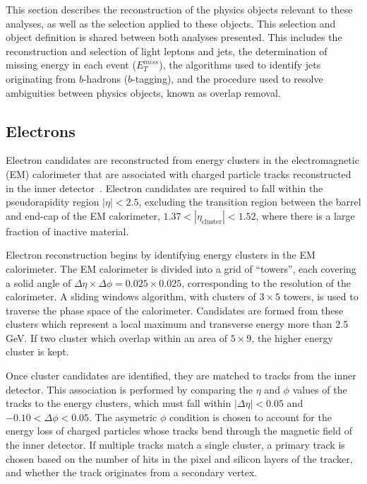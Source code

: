 
This section describes the reconstruction of the physics objects relevant to these analyses, as well as the selection applied to these objects. This selection and object definition is shared between both analyses presented. This includes the reconstruction and selection of light leptons and jets, the determination of missing energy in each event ($E_T^{miss}$), the algorithms used to identify jets originating from $b$-hadrons ($b$-tagging), and the procedure used to resolve ambiguities between physics objects, known as overlap removal.

\subsection{Electrons}
\label{obj:ele}

Electron candidates are reconstructed from energy clusters in the electromagnetic (EM) calorimeter that are associated with charged particle tracks reconstructed in the inner detector~\cite{ATLAS-CONF-2016-024}. Electron candidates are required to fall within the pseudorapidity region $|\eta| < 2.5$, excluding the transition region between the barrel and end-cap of the EM calorimeter, $1.37 < |\eta_\textrm{cluster}| < 1.52$, where there is a large fraction of inactive material. 

Electron reconstruction begins by identifying energy clusters in the EM calorimeter. The EM calorimeter is divided into a grid of ``towers'', each covering a solid angle of $\Delta\eta\times\Delta\phi = 0.025\times 0.025$, corresponding to the resolution of the calorimeter. A sliding windows algorithm, with clusters of $3\times 5$ towers, is used to traverse the phase space of the calorimeter. Candidates are formed from these clusters which represent a local maximum and transverse energy more than 2.5 GeV. If two cluster which overlap within an area of $5\times 9$, the higher energy cluster is kept.

Once cluster candidates are identified, they are matched to tracks from the inner detector. This association is performed by comparing the $\eta$ and $\phi$ values of the tracks to the energy clusters, which must fall within $|\Delta\eta| < 0.05$ and $-0.10 < \Delta\phi < 0.05$. The asymetric $\phi$ condition is chosen to account for the energy loss of charged particles whose tracks bend through the magnetic field of the inner detector. If multiple tracks match a single cluster, a primary track is chosen based on the number of hits in the pixel and silicon layers of the tracker, and whether the track originates from a secondary vertex.

